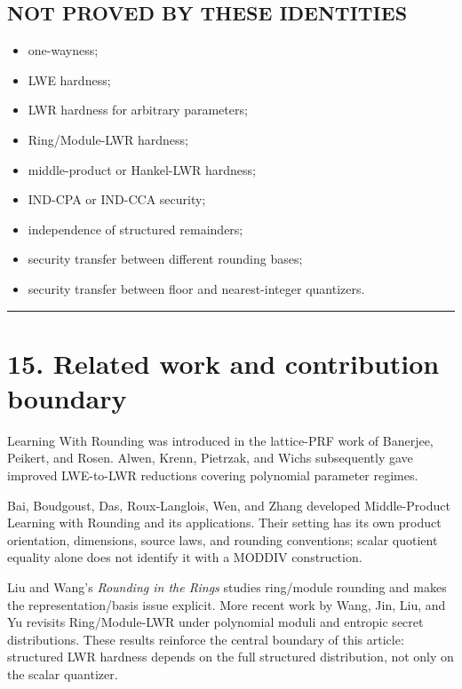 \documentclass[11pt,a4paper]{article}
\providecommand{\tightlist}{\setlength{\itemsep}{0pt}\setlength{\parskip}{0pt}}
\begin{document}
\subsection{NOT PROVED BY THESE IDENTITIES}\label{not-proved-by-these-identities}

\begin{itemize}
\tightlist
\item
  one-wayness;
\item
  LWE hardness;
\item
  LWR hardness for arbitrary parameters;
\item
  Ring/Module-LWR hardness;
\item
  middle-product or Hankel-LWR hardness;
\item
  IND-CPA or IND-CCA security;
\item
  independence of structured remainders;
\item
  security transfer between different rounding bases;
\item
  security transfer between floor and nearest-integer quantizers.
\end{itemize}

\begin{center}\rule{0.5\linewidth}{0.5pt}\end{center}

\section{15. Related work and contribution boundary}\label{related-work-and-contribution-boundary}

Learning With Rounding was introduced in the lattice-PRF work of Banerjee, Peikert, and Rosen. Alwen, Krenn, Pietrzak, and Wichs subsequently gave improved LWE-to-LWR reductions covering polynomial parameter regimes.

Bai, Boudgoust, Das, Roux-Langlois, Wen, and Zhang developed Middle-Product Learning with Rounding and its applications. Their setting has its own product orientation, dimensions, source laws, and rounding conventions; scalar quotient equality alone does not identify it with a MODDIV construction.

Liu and Wang's \emph{Rounding in the Rings} studies ring/module rounding and makes the representation/basis issue explicit. More recent work by Wang, Jin, Liu, and Yu revisits Ring/Module-LWR under polynomial moduli and entropic secret distributions. These results reinforce the central boundary of this article: structured LWR hardness depends on the full structured distribution, not only on the scalar quantizer.
\end{document}
